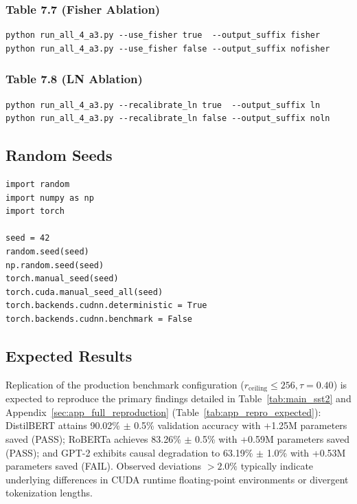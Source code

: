 \subsubsection{Table 7.7 (Fisher Ablation)}

\begin{lstlisting}
python run_all_4_a3.py --use_fisher true  --output_suffix fisher
python run_all_4_a3.py --use_fisher false --output_suffix nofisher
\end{lstlisting}

\subsubsection{Table 7.8 (LN Ablation)}

\begin{lstlisting}
python run_all_4_a3.py --recalibrate_ln true  --output_suffix ln
python run_all_4_a3.py --recalibrate_ln false --output_suffix noln
\end{lstlisting}

\subsection{Random Seeds}

\begin{lstlisting}
import random
import numpy as np
import torch

seed = 42
random.seed(seed)
np.random.seed(seed)
torch.manual_seed(seed)
torch.cuda.manual_seed_all(seed)
torch.backends.cudnn.deterministic = True
torch.backends.cudnn.benchmark = False
\end{lstlisting}

\subsection{Expected Results}

Replication of the production benchmark configuration ($r_{\mathrm{ceiling}} \le 256, \tau=0.40$) is expected to reproduce the primary findings detailed in Table~\ref{tab:main_sst2} and Appendix~\ref{sec:app_full_reproduction} (Table~\ref{tab:app_repro_expected}): DistilBERT attains 90.02\% $\pm$ 0.5\% validation accuracy with +1.25M parameters saved (PASS); RoBERTa achieves 83.26\% $\pm$ 0.5\% with +0.59M parameters saved (PASS); and GPT-2 exhibits causal degradation to 63.19\% $\pm$ 1.0\% with +0.53M parameters saved (FAIL). Observed deviations $>2.0\%$ typically indicate underlying differences in CUDA runtime floating-point environments or divergent tokenization lengths.

